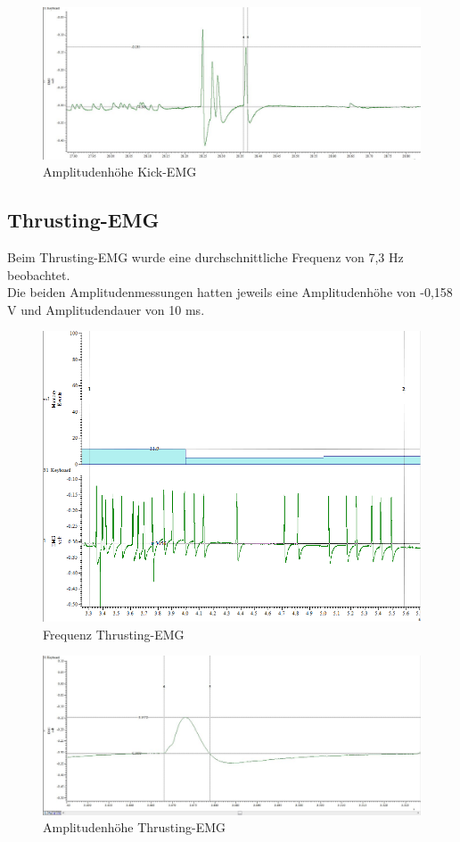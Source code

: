 \documentclass[a4paper]{article}
\begin{document}
\begin{figure}[H]
    \centering
        \includegraphics[scale=0.35]{images/kick.JPG}
    \caption{Amplitudenhöhe Kick-EMG}
\end{figure}


\subsection{Thrusting-EMG}
Beim Thrusting-EMG wurde eine durchschnittliche Frequenz von 7,3 Hz beobachtet. \\
Die beiden Amplitudenmessungen hatten jeweils eine Amplitudenhöhe von -0,158 V und Amplitudendauer von 10 ms.
\vspace{2.5\baselineskip}
\begin{figure}[H]
    \centering
    \includegraphics[scale=0.5]{images/thrusting_freq.png}
    \caption{Frequenz Thrusting-EMG}
\end{figure}
\begin{figure}[H]
    \centering
    \includegraphics[scale=0.35]{images/thrusting.JPG}
    \caption{Amplitudenhöhe Thrusting-EMG}
\end{figure}
\end{document}
